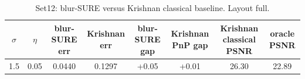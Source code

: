 \begin{table}[h]
\centering
\small
\begin{tabular}{cccccccc}
\toprule
$\sigma$ & $\eta$ & blur-SURE err & Krishnan err & blur-SURE gap & Krishnan PnP gap & Krishnan classical PSNR & oracle PSNR \\
\midrule
1.5 & 0.05 & 0.0440 & 0.1297 & +0.05 & +0.01 & 26.30 & 22.89 \\
\bottomrule
\end{tabular}
\caption{Set12: blur-SURE versus Krishnan classical baseline. Layout full.}
\label{tab:krishnan_compare_set12}
\end{table}
